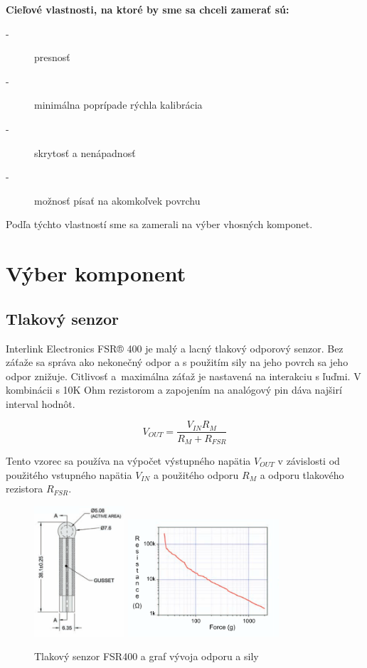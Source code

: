 \textbf{Cieľové vlastnosti, na ktoré by sme sa chceli zamerať sú:}
\begin{description}
	\item[-]{presnosť}
	\item[-]{minimálna poprípade rýchla kalibrácia}
	\item[-]{skrytosť a nenápadnosť}
	\item[-]{možnosť písať na akomkoľvek povrchu}
\end{description}

Podľa týchto vlastností sme sa zamerali na výber vhosných komponet.

\section{Výber komponent}

\subsection*{Tlakový senzor}

Interlink Electronics FSR® 400 je malý a lacný tlakový odporový senzor. Bez záťaže sa správa ako nekonečný odpor a s použitím sily na jeho povrch sa jeho odpor znižuje. Citlivosť a~maximálna záťaž je nastavená na interakciu s ľuďmi. \cite{fsr400} V kombinácii s 10K Ohm rezistorom a zapojením na analógový pin dáva najširí interval hodnôt. 

\[
V_{OUT} = \frac{V_{IN} R_M} {R_M + R_{FSR}}
\]

Tento vzorec sa používa na výpočet výstupného napätia $V_{OUT}$ v závislosti od použitého vstupného napätia $V_{IN}$ a použitého odporu $R_M$ a odporu tlakového rezistora $R_{FSR}$.

\begin{figure}[hbt]
	\centering
	\includegraphics[width=0.3\textwidth]{obrazky-figures/fsr400.png}
	\includegraphics[width=0.5\textwidth]{obrazky-figures/FSRodporSila.png}
	\caption{Tlakový senzor FSR400 a graf vývoja odporu a sily}
	\label{Odpor sila}
\end{figure}

